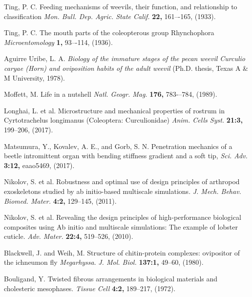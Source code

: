\documentclass[twocolumn, linenumbers, superscriptaddress, nofootinbib]{revtex4-1}
\begin{document}
\begin{thebibliography}{50}
				Ting, P. C.
				Feeding mechanisms of weevils, their function, and relationship to classification
				\textit{Mon. Bull. Dep. Agric. State Calif.}
				\textbf{22,}
				161–-165,
				(1933).
			
				Ting, P. C.
				The mouth parts of the coleopterous group Rhynchophora
				\textit{Microentomology}
				\textbf{1,}
				93–-114,
				(1936).
			
				Aguirre Uribe, L. A.
				\textit{Biology of the immature stages of the pecan weevil \textnormal{Curculio caryae} (Horn) and oviposition habits of the adult weevil}
				(Ph.D. thesis,
				Texas A \& M University,
				1978).
			
				Moffett, M.
				Life in a nutshell
				\textit{Natl. Geogr. Mag.}
				\textbf{176,}
				783-–784,
				(1989).
			
				Longhai, L. et al.
				Microstructure and mechanical properties of rostrum in Cyrtotrachelus longimanus (Coleoptera: Curculionidae)
				\textit{Anim. Cells Syst.}
				\textbf{21:3,}
				199--206,
				(2017).
			
				Matsumura, Y., Kovalev, A. E., and Gorb, S. N.
				Penetration mechanics of a beetle intromittent organ with bending stiffness gradient and a soft tip,
				\textit{Sci. Adv.}
				\textbf{3:12,}
				eaao5469,
				(2017).
				
				Nikolov, S. et al.
				Robustness and optimal use of design principles of arthropod exoskeletons studied by ab initio-based multiscale simulations.
				\textit{J. Mech. Behav. Biomed. Mater.}
				\textbf{4:2,}
				129--145,
				(2011).
			
				Nikolov, S. et al.
				Revealing the design principles of high-performance biological composites using Ab initio and multiscale simulations: The example of lobster cuticle.
				\textit{Adv. Mater.}
				\textbf{22:4,}
				519--526,
				(2010).
			
				Blackwell, J. and Weih, M.
				Structure of chitin-protein complexes: ovipositor of the ichneumon fly \textit{Megarhyssa}.
				\textit{J. Mol. Biol.}
				\textbf{137:1,}
				49--60,
				(1980).
			
				Bouligand, Y.
				Twisted fibrous arrangements in biological materials and cholesteric mesophases.
				\textit{Tissue Cell}
				\textbf{4:2,}
				189--217,
				(1972).
			

\end{thebibliography}
\end{document}
